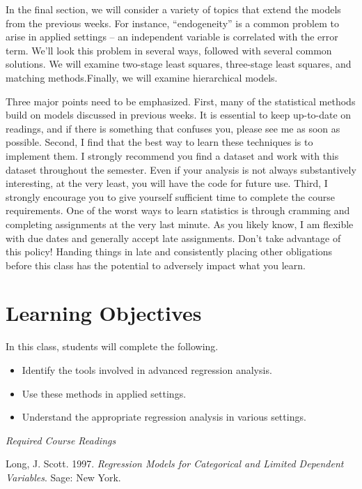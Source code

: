 \documentclass[
]{book}
\begin{document}
In the final section, we will consider a variety of topics that extend the models from the previous weeks. For instance, ``endogeneity'' is a common problem to arise in applied settings -- an independent variable is correlated with the error term. We'll look this problem in several ways, followed with several common solutions. We will examine two-stage least squares, three-stage least squares, and matching methods.Finally, we will examine hierarchical models.

Three major points need to be emphasized. First, many of the statistical methods build on models discussed in previous weeks. It is essential to keep up-to-date on readings, and if there is something that confuses you, please see me as soon as possible. Second, I find that the best way to learn these techniques is to implement them. I strongly recommend you find a dataset and work with this dataset throughout the semester. Even if your analysis is not always substantively interesting, at the very least, you will have the code for future use. Third, I strongly encourage you to give yourself sufficient time to complete the course requirements. One of the worst ways to learn statistics is through cramming and completing assignments at the very last minute. As you likely know, I am flexible with due dates and generally accept late assignments. Don't take advantage of this policy! Handing things in late and consistently placing other obligations before this class has the potential to adversely impact what you learn.

\section{Learning Objectives}\label{learning-objectives}

In this class, students will complete the following.

\begin{itemize}
\item
  Identify the tools involved in advanced regression analysis.
\item
  Use these methods in applied settings.
\item
  Understand the appropriate regression analysis in various settings.
\end{itemize}

\emph{Required Course Readings}

Long, J. Scott. 1997. \emph{Regression Models for Categorical and Limited Dependent Variables}. Sage: New York.
\end{document}
